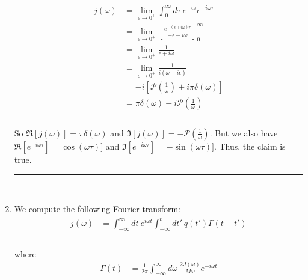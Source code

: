 \documentclass[]{article}
\begin{document}
\begin{enumerate}[1)]
\begin{equation}
\begin{aligned}
j(\omega) & = \lim_{\epsilon \to 0^+} \int_{0 }^{\infty} d \tau \: e^{ - \epsilon \tau} e^{ -  i \omega \tau}  \\
& =  \lim_{\epsilon \to 0^+}   \left[ \frac{ e^{  -  ( \epsilon +  i  \omega) \tau} }{ -\epsilon  - i  \omega  }   \right]_{0 }^{\infty} \\
& =    \lim_{\epsilon \to 0^+}   \frac{ 1  }{   \epsilon +  i \omega }   \\
& =    \lim_{\epsilon \to 0^+}   \frac{ 1  }{ i (  \omega - i  \epsilon )   }   \\
& =    - i   \left[  \mathscr{P} \left(  \frac{1}{\omega}  \right)  + i \pi \delta(\omega)   \right] \\
& =    \pi \delta(\omega)    - i   \mathscr{P} \left(  \frac{1}{\omega}  \right)    \\
\end{aligned}
\end{equation} \\

So $\Re[ j(\omega) ] = \pi \delta(\omega)$ and $\Im[ j(\omega) ] =  - \mathscr{P} \left(  \frac{1}{\omega}  \right) $. But we also have $\Re[ e^{ - i \omega \tau} ] = \cos(\omega \tau) ]$ and $\Im[ e^{ - i \omega \tau} ] = - \sin(\omega \tau)] $. Thus, the claim is true. \\

\noindent\rule{15cm}{0.4pt} \\

\item We compute the following Fourier transform: \\

\begin{equation}
\begin{aligned}
j(\omega) & = \int_{-\infty}^{\infty} dt \: e^{ i \omega t } \int_{-\infty}^{t} dt' \: \dot{q}(t') \Gamma(t - t' )  \\ %
\end{aligned}
\end{equation} \\

where \\

\begin{equation}
\begin{aligned}
\Gamma(t) & = \frac{ 1 }{ 2\pi } \int_{-\infty}^{\infty} d\omega \: \frac{ 2 J( \omega ) }{M \omega } e^{ - i \omega t } \\
\end{aligned}
\end{equation} \\


\end{enumerate}
\end{document}
